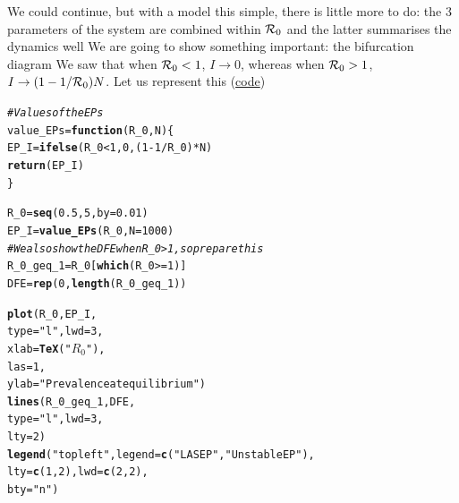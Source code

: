 \documentclass[aspectratio=169]{beamer}\usepackage[]{graphicx}\usepackage[]{xcolor}
\makeatletter
\newcommand{\hlnum}[1]{\textcolor[rgb]{0.686,0.059,0.569}{#1}}%
\newcommand{\hlsng}[1]{\textcolor[rgb]{0.192,0.494,0.8}{#1}}%
\newcommand{\hlcom}[1]{\textcolor[rgb]{0.678,0.584,0.686}{\textit{#1}}}%
\newcommand{\hlopt}[1]{\textcolor[rgb]{0,0,0}{#1}}%
\newcommand{\hldef}[1]{\textcolor[rgb]{0.345,0.345,0.345}{#1}}%
\newcommand{\hlkwa}[1]{\textcolor[rgb]{0.161,0.373,0.58}{\textbf{#1}}}%
\newcommand{\hlkwb}[1]{\textcolor[rgb]{0.69,0.353,0.396}{#1}}%
\newcommand{\hlkwc}[1]{\textcolor[rgb]{0.333,0.667,0.333}{#1}}%
\newcommand{\hlkwd}[1]{\textcolor[rgb]{0.737,0.353,0.396}{\textbf{#1}}}%
\newenvironment{kframe}{%
 \def\at@end@of@kframe{}%
 \ifinner\ifhmode%
  \def\at@end@of@kframe{\end{minipage}}%
  \begin{minipage}{\columnwidth}%
 \fi\fi%
 \def\FrameCommand##1{\hskip\@totalleftmargin \hskip-\fboxsep
 \colorbox{shadecolor}{##1}\hskip-\fboxsep
     \hskip-\linewidth \hskip-\@totalleftmargin \hskip\columnwidth}%
 \MakeFramed {\advance\hsize-\width
   \@totalleftmargin\z@ \linewidth\hsize
   \@setminipage}}%
 {\par\unskip\endMakeFramed%
 \at@end@of@kframe}
\newenvironment{knitrout}{}{} %
\makeatother
\begin{document}
\begin{frame}
We could continue, but with a model this simple, there is little  more to do: the 3 parameters of the system are combined within $\mathcal{R}_0$ and the latter summarises the dynamics well
\vfill
We are going to show something important: the bifurcation diagram
\vfill
We saw that when $\mathcal{R}_0<1$, $I\to 0$, whereas when $\mathcal{R}_0>1$, $I\to (1-1/\mathcal{R}_0)N$. Let us represent this (\href{https://raw.githubusercontent.com/julien-arino/3MC-2023-12-Arba-Minch/main/CODE/SIS_PEI_vs_R0.R}{code})
\end{frame}

\begin{knitrout}
\color{fgcolor}\begin{kframe}
\begin{alltt}
\hlcom{# Values of the EPs}
\hldef{value_EPs} \hlkwb{=} \hlkwa{function}\hldef{(}\hlkwc{R_0}\hldef{,} \hlkwc{N}\hldef{) \{}
  \hldef{EP_I} \hlkwb{=} \hlkwd{ifelse}\hldef{(R_0} \hlopt{<} \hlnum{1}\hldef{,} \hlnum{0}\hldef{, (}\hlnum{1}\hlopt{-}\hlnum{1}\hlopt{/}\hldef{R_0)}\hlopt{*}\hldef{N)}
  \hlkwd{return}\hldef{(EP_I)}
\hldef{\}}

\hldef{R_0} \hlkwb{=} \hlkwd{seq}\hldef{(}\hlnum{0.5}\hldef{,} \hlnum{5}\hldef{,} \hlkwc{by} \hldef{=} \hlnum{0.01}\hldef{)}
\hldef{EP_I} \hlkwb{=} \hlkwd{value_EPs}\hldef{(R_0,} \hlkwc{N} \hldef{=} \hlnum{1000}\hldef{)}
\hlcom{# We also show the DFE when R_0>1, so prepare this}
\hldef{R_0_geq_1} \hlkwb{=} \hldef{R_0[}\hlkwd{which}\hldef{(R_0}\hlopt{>=}\hlnum{1}\hldef{)]}
\hldef{DFE} \hlkwb{=} \hlkwd{rep}\hldef{(}\hlnum{0}\hldef{,} \hlkwd{length}\hldef{(R_0_geq_1))}

\hlkwd{plot}\hldef{(R_0, EP_I,}
     \hlkwc{type} \hldef{=} \hlsng{"l"}\hldef{,} \hlkwc{lwd} \hldef{=} \hlnum{3}\hldef{,}
     \hlkwc{xlab} \hldef{=} \hlkwd{TeX}\hldef{(}\hlsng{"$R_0$"}\hldef{),}
     \hlkwc{las} \hldef{=} \hlnum{1}\hldef{,}
     \hlkwc{ylab} \hldef{=} \hlsng{"Prevalence at equilibrium"}\hldef{)}
\hlkwd{lines}\hldef{(R_0_geq_1, DFE,}
      \hlkwc{type} \hldef{=} \hlsng{"l"}\hldef{,} \hlkwc{lwd} \hldef{=} \hlnum{3}\hldef{,}
      \hlkwc{lty} \hldef{=} \hlnum{2}\hldef{)}
\hlkwd{legend}\hldef{(}\hlsng{"topleft"}\hldef{,} \hlkwc{legend} \hldef{=} \hlkwd{c}\hldef{(}\hlsng{"LAS EP"}\hldef{,} \hlsng{"Unstable EP"}\hldef{),}
       \hlkwc{lty} \hldef{=} \hlkwd{c}\hldef{(}\hlnum{1}\hldef{,} \hlnum{2}\hldef{),} \hlkwc{lwd} \hldef{=} \hlkwd{c}\hldef{(}\hlnum{2}\hldef{,}\hlnum{2}\hldef{),}
       \hlkwc{bty} \hldef{=} \hlsng{"n"}\hldef{)}
\end{alltt}
\end{kframe}
\end{knitrout}
\end{document}
